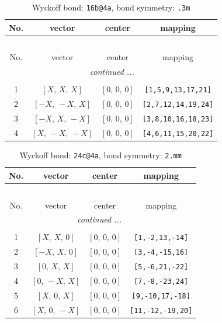 \documentclass[fleqn,8pt]{jsarticle}
\begin{document}
\begin{longtable}{cccc}
\caption{Wyckoff bond: {\tt 16b@4a}, bond symmetry: {\tt .3m}}
 \\
 \hline \hline
No. & vector & center & mapping \\ \hline \endfirsthead

\multicolumn{3}{l}{\tablename\ \thetable{}} \\
 \hline \hline
No. & vector & center & mapping \\ \hline \endhead

 \hline \hline
\multicolumn{3}{r}{\footnotesize\it continued ...} \\ \endfoot

 \hline \hline
\multicolumn{3}{r}{} \\ \endlastfoot

1 & $\left[ X,\, X,\, X \right]$ & $\left[ 0,\, 0,\, 0 \right]$ & {\tt [1,5,9,13,17,21]} \\ \hline
2 & $\left[ - X,\, - X,\, X \right]$ & $\left[ 0,\, 0,\, 0 \right]$ & {\tt [2,7,12,14,19,24]} \\ \hline
3 & $\left[ - X,\, X,\, - X \right]$ & $\left[ 0,\, 0,\, 0 \right]$ & {\tt [3,8,10,16,18,23]} \\ \hline
4 & $\left[ X,\, - X,\, - X \right]$ & $\left[ 0,\, 0,\, 0 \right]$ & {\tt [4,6,11,15,20,22]} \\
\end{longtable}
\renewcommand{\arraystretch}{1.2}
\begin{longtable}{cccc}
\caption{Wyckoff bond: {\tt 24c@4a}, bond symmetry: {\tt 2.mm}}
 \\
 \hline \hline
No. & vector & center & mapping \\ \hline \endfirsthead

\multicolumn{3}{l}{\tablename\ \thetable{}} \\
 \hline \hline
No. & vector & center & mapping \\ \hline \endhead

 \hline \hline
\multicolumn{3}{r}{\footnotesize\it continued ...} \\ \endfoot

 \hline \hline
\multicolumn{3}{r}{} \\ \endlastfoot

1 & $\left[ X,\, X,\, 0 \right]$ & $\left[ 0,\, 0,\, 0 \right]$ & {\tt [1,-2,13,-14]} \\ \hline
2 & $\left[ - X,\, X,\, 0 \right]$ & $\left[ 0,\, 0,\, 0 \right]$ & {\tt [3,-4,-15,16]} \\ \hline
3 & $\left[ 0,\, X,\, X \right]$ & $\left[ 0,\, 0,\, 0 \right]$ & {\tt [5,-6,21,-22]} \\ \hline
4 & $\left[ 0,\, - X,\, X \right]$ & $\left[ 0,\, 0,\, 0 \right]$ & {\tt [7,-8,-23,24]} \\ \hline
5 & $\left[ X,\, 0,\, X \right]$ & $\left[ 0,\, 0,\, 0 \right]$ & {\tt [9,-10,17,-18]} \\ \hline
6 & $\left[ X,\, 0,\, - X \right]$ & $\left[ 0,\, 0,\, 0 \right]$ & {\tt [11,-12,-19,20]} \\
\end{longtable}
\end{document}
